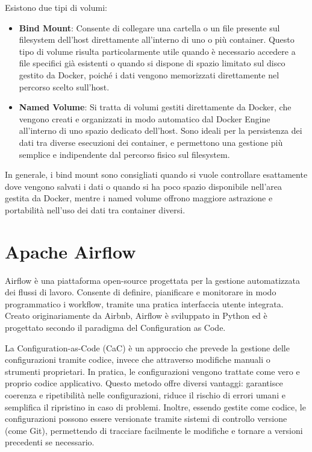 Esistono due tipi di volumi:
\begin{itemize}
    \item \textbf{Bind Mount}: Consente di collegare una cartella o un file presente sul filesystem dell’host direttamente all’interno di uno o più container. Questo tipo di volume risulta particolarmente utile quando è necessario accedere a file specifici già esistenti o quando si dispone di spazio limitato sul disco gestito da Docker, poiché i dati vengono memorizzati direttamente nel percorso scelto sull’host.
    \item \textbf{Named Volume}: Si tratta di volumi gestiti direttamente da Docker, che vengono creati e organizzati in modo automatico dal Docker Engine all’interno di uno spazio dedicato dell’host. Sono ideali per la persistenza dei dati tra diverse esecuzioni dei container, e permettono una gestione più semplice e indipendente dal percorso fisico sul filesystem.
\end{itemize}

In generale, i bind mount sono consigliati quando si vuole controllare esattamente dove vengono salvati i dati o quando si ha poco spazio disponibile nell’area gestita da Docker, mentre i named volume offrono maggiore astrazione e portabilità nell’uso dei dati tra container diversi.




\section{Apache Airflow}
\label{sec:airflow}
Airflow è una piattaforma open-source progettata per la gestione automatizzata dei flussi di lavoro. Consente di definire, pianificare e monitorare in modo programmatico i workflow, tramite una pratica interfaccia utente integrata.
Creato originariamente da Airbnb, Airflow è sviluppato in Python ed è progettato secondo il paradigma del Configuration as Code. 

La Configuration-as-Code (CaC) è un approccio che prevede la gestione delle configurazioni tramite codice, invece che attraverso modifiche manuali o strumenti proprietari. In pratica, le configurazioni vengono trattate come vero e proprio codice applicativo. Questo metodo offre diversi vantaggi: garantisce coerenza e ripetibilità nelle configurazioni, riduce il rischio di errori umani e semplifica il ripristino in caso di problemi. Inoltre, essendo gestite come codice, le configurazioni possono essere versionate tramite sistemi di controllo versione (come Git), permettendo di tracciare facilmente le modifiche e tornare a versioni precedenti se necessario.

